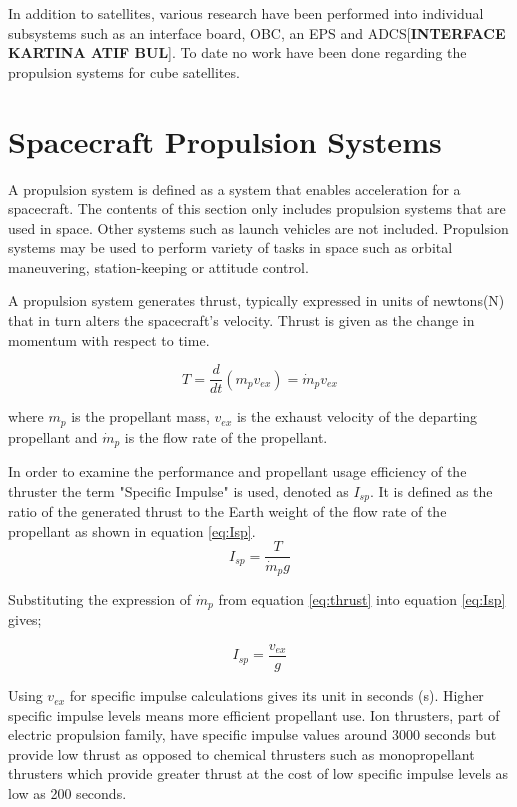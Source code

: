 In addition to satellites, various research have been performed into individual subsystems such as an interface board, OBC, an EPS and ADCS\cite{aslan2015integration}\cite{karabulut}[\textbf{INTERFACE KARTINA ATIF BUL}]. To date no work have been done regarding the propulsion systems for cube satellites. 

\section{Spacecraft Propulsion Systems}

A propulsion system is defined as a system that enables acceleration for a spacecraft. The contents of this section only includes propulsion systems that are used in space. Other systems such as launch vehicles are not included. 
Propulsion systems may be used to perform variety of tasks in space such as orbital maneuvering, station-keeping or attitude control. 
\par A propulsion system generates thrust, typically expressed in units of newtons(N) that in turn alters the spacecraft's velocity. Thrust is given as the change in momentum with respect to time\cite{goebel2008fundamentals}.

\begin{equation}
    T = \frac{d}{dt}(m_p v_{ex}) = \dot{m}_p v_{ex}
    \label{eq:thrust}
\end{equation}

where $m_p$ is the propellant mass, $v_{ex}$ is the exhaust velocity of the departing propellant and $\dot{m}_p$ is the flow rate of the propellant.


\par In order to examine the performance and propellant usage efficiency of the thruster the term "Specific Impulse" is used, denoted as $I_{sp}$. It is defined as the ratio of the generated thrust to the Earth weight of the flow rate of the propellant as shown in equation \ref{eq:Isp}.
\begin{equation}
    I_{sp} = \frac{T}{\dot{m}_p g}
    \label{eq:Isp}
\end{equation}

Substituting the expression of $\dot{m}_p$ from equation \ref{eq:thrust} into equation \ref{eq:Isp} gives;

\begin{equation}
    I_{sp} = \frac{v_{ex}}{g}
    \label{eq:IspVex}
\end{equation}

Using $v_{ex}$ for specific impulse calculations gives its unit in seconds (s). Higher specific impulse levels means more efficient propellant use. Ion thrusters, part of electric propulsion family, have specific impulse values around 3000 seconds but provide low thrust as opposed to chemical thrusters such as monopropellant thrusters which provide greater thrust at the cost of low specific impulse levels as low as 200 seconds\cite{tsay2009micro}\cite{lemmer2017propulsion}.



